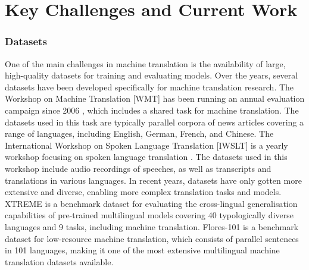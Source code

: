 \documentclass[11pt]{article}
\begin{document}
\section{Key Challenges and Current Work} \vspace{-0.7em}
\subsubsection*{Datasets} \vspace{-2mm}
One of the main challenges in machine translation is the availability of large, high-quality datasets for training and evaluating models. Over the years, several datasets have been developed specifically for machine translation research. 
The Workshop on Machine Translation [WMT] has been running an annual evaluation campaign since 2006 \citep{zerva-etal-2022-findings, specia2020findings, koehn2018findings, buck2016findings}, which includes a shared task for machine translation. The datasets used in this task are typically parallel corpora of news articles covering a range of languages, including English, German, French, and Chinese.
The International Workshop on Spoken Language Translation [IWSLT] is a yearly workshop focusing on spoken language translation \citep{antonios2022findings, ansari2020findings, iwslt-2018-international, cettolo2016iwslt}. The datasets used in this workshop include audio recordings of speeches, as well as transcripts and translations in various languages.
In recent years, datasets have only gotten more extensive and diverse, enabling more complex translation tasks and models.
XTREME \citep{hu2020xtreme} is a benchmark dataset for evaluating the cross-lingual generalisation capabilities of pre-trained multilingual models covering 40 typologically diverse languages and 9 tasks, including machine translation.
Flores-101 \citep{goyal2022flores} is a benchmark dataset for low-resource machine translation, which consists of parallel sentences in 101 languages, making it one of the most extensive multilingual machine translation datasets available.
\end{document}
